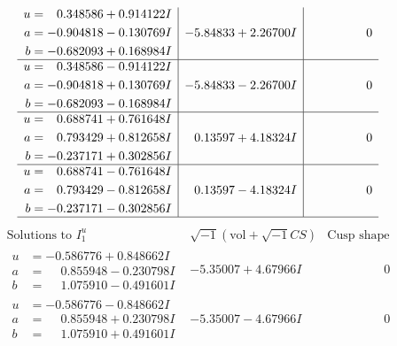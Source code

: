 \documentclass[1p]{elsarticle_modified}
\theoremstyle{definition}
\newcommand{\I}{\sqrt{-1}}
\begin{document}
$$\begin{array}{c|c|c}
\begin{aligned}
u &= \phantom{-}0.348586 + 0.914122 I \\
a &= -0.904818 - 0.130769 I \\
b &= -0.682093 + 0.168984 I\end{aligned}
 & -5.84833 + 2.26700 I & \phantom{-0.000000 } 0 \\ \hline\begin{aligned}
u &= \phantom{-}0.348586 - 0.914122 I \\
a &= -0.904818 + 0.130769 I \\
b &= -0.682093 - 0.168984 I\end{aligned}
 & -5.84833 - 2.26700 I & \phantom{-0.000000 } 0 \\ \hline\begin{aligned}
u &= \phantom{-}0.688741 + 0.761648 I \\
a &= \phantom{-}0.793429 + 0.812658 I \\
b &= -0.237171 + 0.302856 I\end{aligned}
 & \phantom{-}0.13597 + 4.18324 I & \phantom{-0.000000 } 0 \\ \hline\begin{aligned}
u &= \phantom{-}0.688741 - 0.761648 I \\
a &= \phantom{-}0.793429 - 0.812658 I \\
b &= -0.237171 - 0.302856 I\end{aligned}
 & \phantom{-}0.13597 - 4.18324 I & \phantom{-0.000000 } 0\\
 \hline 
 \end{array}$$\newpage$$\begin{array}{c|c|c}  
\text{Solutions to }I^u_{1}& \I (\text{vol} + \sqrt{-1}CS) & \text{Cusp shape}\\
 \hline 
\begin{aligned}
u &= -0.586776 + 0.848662 I \\
a &= \phantom{-}0.855948 - 0.230798 I \\
b &= \phantom{-}1.075910 - 0.491601 I\end{aligned}
 & -5.35007 + 4.67966 I & \phantom{-0.000000 } 0 \\ \hline\begin{aligned}
u &= -0.586776 - 0.848662 I \\
a &= \phantom{-}0.855948 + 0.230798 I \\
b &= \phantom{-}1.075910 + 0.491601 I\end{aligned}
 & -5.35007 - 4.67966 I & \phantom{-0.000000 } 0 \\ \hline\begin{aligned}

\end{aligned}
\end{array}$$
\end{document}
